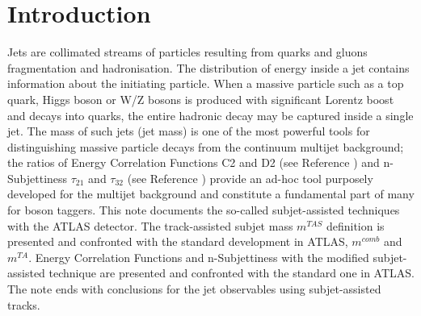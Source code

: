 \documentclass[UKenglish,texlive=2013]{\ATLASLATEXPATH atlasdoc}
\begin{document}
\maketitle

\tableofcontents

\newpage

\section{Introduction}
\label{sec:intro}



Jets are collimated streams of particles resulting from quarks and gluons fragmentation and hadronisation.
The distribution of energy inside a jet contains information about the initiating particle. When a massive
particle such as a top quark, Higgs boson or W/Z bosons is produced with significant Lorentz boost and decays into
quarks, the entire hadronic decay may be captured inside a single jet. The mass of such jets (jet mass)
is one of the most powerful tools for distinguishing massive particle decays from the continuum multijet
background; the ratios of Energy Correlation Functions C2 and D2 (see Reference \cite{bib:ECF}) and n-Subjettiness $\tau_{21}$ and $\tau_{32}$ (see Reference \cite{bib:nsub}) provide an ad-hoc tool purposely developed for the multijet background and constitute a fundamental part of many for boson taggers.
This note documents the so-called subjet-assisted techniques with the ATLAS detector. 
The track-assisted subjet mass $m^{TAS}$ definition is presented and confronted with the standard development in ATLAS, $m^{comb}$ and $m^{TA}$. 
Energy Correlation Functions and n-Subjettiness with the modified subjet-assisted technique are presented and confronted with the standard one in ATLAS.
The note ends with conclusions for the jet observables using subjet-assisted tracks.


\end{document}
